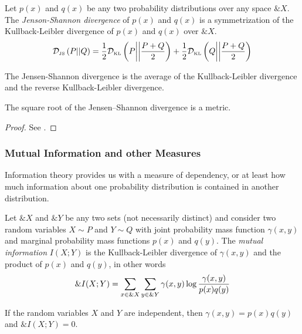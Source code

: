\begin{definition}
  \label{def:jsd}
  Let $p(x)$ and $q(x)$ be any two probability distributions over any space
  $\&X$. The \textit{Jenson-Shannon divergence} of $p(x)$ and $q(x)$ is a
  symmetrization of the Kullback-Leibler divergence of $p(x)$ and $q(x)$ over
  $\&X$.
  \begin{align}
    \mathcal{D}_{\text{\tiny JS}}\left(P\middle|\middle|Q\right) = {1 \over 2} \mathcal{D}_{\text{\tiny KL}}\left( P \middle| \middle| P + Q \over 2 \right) + {1 \over 2} \mathcal{D}_{\text{\tiny KL}}\left( Q \middle| \middle| P + Q
    \over 2 \right)
  \end{align}
\end{definition}
\begin{remark}
  The Jensen-Shannon divergence is the average of the Kullback-Leibler
  divergence and the reverse Kullback-Leibler divergence.
\end{remark}

\begin{theorem}
  The square root of the Jensen–Shannon divergence is a metric.
\end{theorem}
\begin{proof}
  See \cite{ref:endres-2003}.
\end{proof}

\subsubsection{Mutual Information and other Measures}

Information theory provides us with a measure of dependency, or at least how
much information about one probability distribution is contained in another
distribution.

\begin{definition}
  Let $\&X$ and $\&Y$ be any two sets (not necessarily distinct) and consider
  two random variables $X \sim P$ and $Y \sim Q$ with joint probability mass
  function $\gamma(x,y)$ and marginal probability mass functions $p(x)$ and
  $q(y)$. The \textit{mutual information} $I(X;Y)$ is the Kullback-Leibler
  divergence of $\gamma(x,y)$ and the product of $p(x)$ and $q(y)$, in other
  words
  \begin{align}
    \label{eq:mutual-information}
    \&I(X; Y) = \sum_{x \in \&X}\sum_{y \in \&Y}\gamma(x, y) \log{{\gamma(x, y) \over p(x)q(y)}}
  \end{align}
\end{definition}

\begin{theorem}
  If the random variables $X$ and $Y$ are independent, then $\gamma(x,y) = p(x)q(y)$
  and $\&I(X; Y) = 0$.
\end{theorem}

